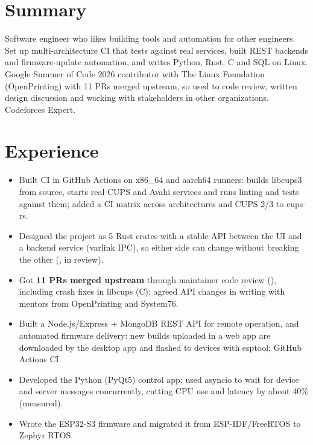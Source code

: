 \documentclass[10pt]{article}
\begin{document}

\section*{Summary}
Software engineer who likes building tools and automation for other engineers. Set up multi-architecture CI that tests against real services, built REST backends and firmware-update automation, and writes Python, Rust, C and SQL on Linux. Google Summer of Code 2026 contributor with The Linux Foundation (OpenPrinting) with 11 PRs merged upstream, so used to code review, written design discussion and working with stakeholders in other organizations. Codeforces Expert.

\section*{Experience}
\begin{itemize}
  \item Built CI in GitHub Actions on x86\_64 and aarch64 runners: builds libcups3 from source, starts real CUPS and Avahi services and runs linting and tests against them; added a CI matrix across architectures and CUPS 2/3 to cups-rs.
  \item Designed the project as 5 Rust crates with a stable API between the UI and a backend service (varlink IPC), so either side can change without breaking the other (, in review).
  \item Got \textbf{11 PRs merged upstream} through maintainer code review (), including crash fixes in libcups (C); agreed API changes in writing with mentors from OpenPrinting and System76.
\end{itemize}
\begin{itemize}
  \item Built a Node.js/Express + MongoDB REST API for remote operation, and automated firmware delivery: new builds uploaded in a web app are downloaded by the desktop app and flashed to devices with esptool; GitHub Actions CI.
  \item Developed the Python (PyQt5) control app; used asyncio to wait for device and server messages concurrently, cutting CPU use and latency by about 40\% (measured).
  \item Wrote the ESP32-S3 firmware and migrated it from ESP-IDF/FreeRTOS to Zephyr RTOS.
\end{itemize}
\end{document}
